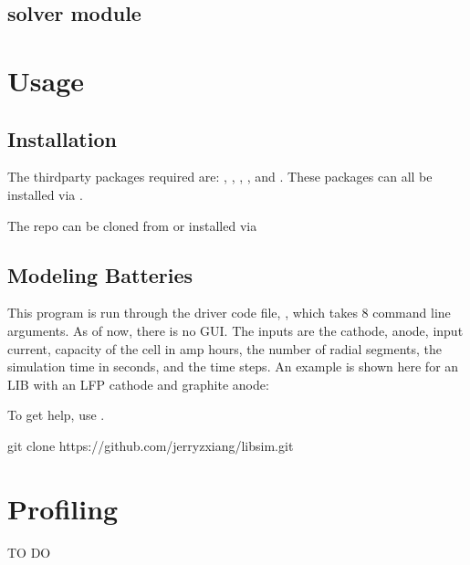 \documentclass[letterpaper,10pt,english]{sphinxmanual}
\begin{document}
\section{solver module}
\label{\detokenize{solver:solver-module}}\label{\detokenize{solver::doc}}

\chapter{Usage}
\label{\detokenize{usage:usage}}\label{\detokenize{usage::doc}}

\section{Installation}
\label{\detokenize{usage:installation}}\label{\detokenize{usage:id1}}
\sphinxAtStartPar
The third\sphinxhyphen{}party packages required are: , , ,
, and . These packages can all be installed via .

\sphinxAtStartPar
The repo can be cloned from  or
installed via


\section{Modeling Batteries}
\label{\detokenize{usage:modeling-batteries}}
\sphinxAtStartPar
This program is run through the driver code file, , which takes 8
command line arguments. As of now, there is no GUI. The inputs are the cathode,
anode, input current, capacity of the cell in amp hours, the number of radial
segments, the simulation time in seconds, and the time steps. An example is
shown here for an LIB with an LFP cathode and graphite anode:

\sphinxAtStartPar
To get help, use .

\begin{sphinxVerbatim}[commandchars=\\\{\}]
git clone https://github.com/jerryzxiang/libsim.git
\end{sphinxVerbatim}


\chapter{Profiling}
\label{\detokenize{profiling:profiling}}\label{\detokenize{profiling::doc}}
\sphinxAtStartPar
TO DO
\end{document}
